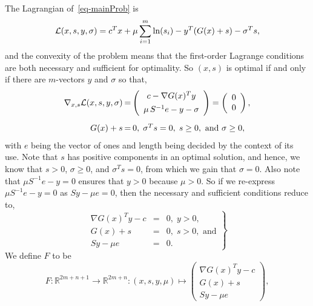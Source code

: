 \documentclass{article}
\def\mR{{\mathbb R}}
\def\cL{{\cal L}}
\begin{document}
The Lagrangian of~\eqref{eq-mainProb} is
\[
\cL(x,s,y,\sigma) = c^Tx + \mu \sum_{i=1}^m \ln(s_i)
                            - y^T(G(x) + s) - \sigma^T s,
\]
and the convexity of the problem means that the first-order
Lagrange conditions are both necessary and sufficient for
optimality. So $(x,s)$ is optimal if and only if there
are $m$-vectors $y$ and $\sigma$ so that,
\[
\begin{array}{rcl}
\displaystyle
\nabla_{x,s} \cL(x,s,y,\sigma)
    & \hspace*{-8pt}=\hspace*{-8pt} & \left( \begin{array}{c} c - \nabla G(x)^T y \\[4pt]
            \mu \, S^{-1} e - y - \sigma \end{array} \right)
    = \left( \begin{array}{c} 0 \\ 0 \end{array} \right), \\[18pt]
\displaystyle G(x) + s & \hspace*{-8pt}=\hspace*{-8pt} & 0, \; \sigma^T s = 0, \; s \ge 0, 
    \mbox{ and } \sigma \ge 0,
\end{array}
\]
with $e$ being the vector of ones and length being decided by
the context of its use. Note that $s$ has positive components
in an optimal solution, and hence, we know that $s > 0$, 
$\sigma \ge 0$, and $\sigma^T s = 0$, from which we gain that 
$\sigma = 0$. Also note that $\mu S^{-1} e - y = 0$ ensures that
$y > 0$ because $\mu > 0$. So if we re-express $\mu S^{-1} e - y = 0$ as
$Sy - \mu e = 0$, then the necessary and sufficient conditions reduce to,
\begin{equation} \label{eq-reducedLagrangeCond}
\left.
\begin{array}{rcl}
\nabla G(x)^T y - c & = & 0, \; y > 0, \\[4pt]
G(x) + s & = & 0, \; s > 0, \mbox{ and} \\[4pt]
Sy - \mu e & = & 0.
\end{array}
\right\}
\end{equation}
We define $F$ to be
\[
F: \mR^{2m+n+1} \rightarrow \mR^{2m+n}
    : (x,s,y,\mu) \mapsto \left(
        \begin{array}{c} 
            \displaystyle \nabla G(x)^T y - c \\[4pt]
            \displaystyle G(x) + s \\[4pt]
            Sy - \mu e 
        \end{array}
        \right),
\]
\end{document}
